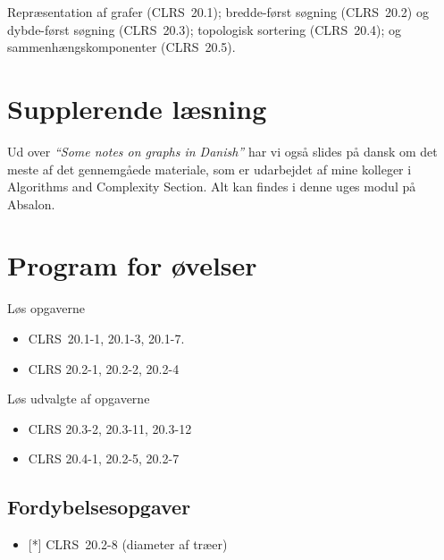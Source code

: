 \documentclass[12pt,a4paper]{article}
\theoremstyle{plain}
\theoremstyle{definition}
\begin{document}
Repræsentation af grafer (CLRS~20.1);
bredde-først søgning (CLRS~20.2)
og
dybde-først søgning  (CLRS~20.3);
topologisk sortering  (CLRS~20.4);
og sammenhængskomponenter (CLRS~20.5).


%   
%   

\section*{Supplerende læsning}

Ud over
\emph{``Some notes on graphs in Danish''}
har vi også slides på dansk om det meste af det gennemgåede materiale,
som er udarbejdet af mine kolleger i Algorithms and Complexity
Section.
Alt kan findes i denne uges modul på Absalon.

\section*{Program for øvelser}


Løs opgaverne
\begin{itemize}
\item CLRS~20.1-1,  20.1-3, 20.1-7.
\item CLRS 20.2-1, 20.2-2, 20.2-4
\end{itemize}

Løs udvalgte af opgaverne
\begin{itemize}
\item CLRS
  20.3-2, 20.3-11,  20.3-12

\item
  CLRS
  20.4-1, 20.2-5, 20.2-7

\end{itemize}



%   




\subsection*{Fordybelsesopgaver}
 \begin{itemize}
  \item{[*]} CLRS~20.2-8 (diameter af træer)
 \end{itemize}
\end{document}
